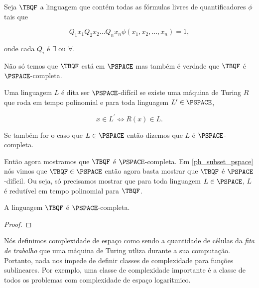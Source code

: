\begin{defi} \label{tbqf_defi}

    Seja $\TBQF$ a linguagem que contém todas as fórmulas livres de quantificadores $\phi$ tais que
    
    \begin{equation*}
        Q_{1} x_{1} Q_{2} x_{2} \dots Q_{n} x_{n} \phi(x_{1}, x_{2}, \dots, x_{n}) = 1,    
    \end{equation*}
    
    onde cada $Q_{i}$ é $\exists$ ou $\forall$.

\end{defi}

Não só temos que $\TBQF$ está em $\PSPACE$ mas também é verdade que $\TBQF$ é $\PSPACE$-completa.

\begin{defi}  \label{pspace_complete_defi}

    Uma linguagem $L$ é dita ser $\PSPACE$-difícil se existe uma máquina de Turing $R$ que roda em tempo polinomial e para toda linguagem $L^{\prime} \in \PSPACE$,
    
    \begin{equation*}
        x \in L^{\prime} \iff R(x) \in L.
    \end{equation*}

    Se também for o caso que $L \in \PSPACE$ então dizemos que $L$ é $\PSPACE$-completa.

\end{defi}

Então agora mostramos que $\TBQF$ é $\PSPACE$-completa. Em \ref{ph_subset_pspace} nós vimos que $\TBQF \in \PSPACE$ então agora basta mostrar que $\TBQF$ é $\PSPACE$-difícil. Ou seja, só precisamos mostrar que para toda linguagem $L \in \PSPACE$, $L$ é redutível em tempo polinomial para $\TBQF$.

\begin{teo} \label{tbqf_pspace_complete}

    A linguagem $\TBQF$ é $\PSPACE$-completa.

\end{teo}

\begin{proof}

\end{proof}

Nós definimos complexidade de espaço como sendo a quantidade de células da \emph{fita de trabalho} que uma máquina de Turing utliza durante a sua computação. Portanto, nada nos impede de definir classes de complexidade para funções sublineares. Por exemplo, uma classe de complexidade importante é a classe de todos os problemas com complexidade de espaço logaritmico.

